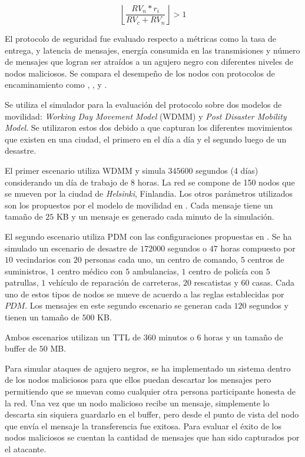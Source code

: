 \begin{equation}
  \left\lfloor \frac{RV_n*r_i}{RV_c+RV_n} \right\rfloor > 1
  \label{eq:fawkes_routing}
\end{equation}




El protocolo de seguridad fue evaluado respecto a métricas como la tasa de
entrega, \overhead{} y latencia de mensajes, energía consumida en las
transmisiones y número de mensajes que logran ser atraídos a un agujero negro
con diferentes niveles de nodos maliciosos. Se compara el desempeño de los nodos
con protocolos de encaminamiento como \syw{} \cite{spyropoulos_spray_2005},
\syf{} \cite{spyropoulos_spray_2007}, \prophet{} y \maxprop.

Se utiliza el simulador \theone{} \cite{keranen_one_2009} para la evaluación del
protocolo sobre dos modelos de movilidad: \textit{Working Day Movement Model}
(WDMM) \cite{ekman_working_2008} y \textit{Post Disaster Mobility Model}. Se
utilizaron estos dos debido a que capturan los diferentes movimientos que
existen en una ciudad, el primero en el día a día y el segundo luego de un
desastre.

El primer escenario utiliza WDMM y simula $345600$ segundos (4 días)
considerando un día de trabajo de $8$ horas. La red se compone de 150 nodos que
se mueven por la ciudad de \textit{Helsinki}, Finlandia. Los otros parámetros
utilizados son los propuestos por el modelo de movilidad en
\cite{ekman_working_2008}.  Cada mensaje tiene un tamaño de $25$ KB y un mensaje
es generado cada minuto de la simulación.

El segundo escenario utiliza PDM con las configuraciones propuestas en
\cite{uddin_post-disaster_2009}. Se ha simulado un escenario de desastre de $172000$
segundos o $47$ horas compuesto por $10$ vecindarios con $20$ personas cada
uno, un centro de comando, $5$ centros de suministros, $1$ centro médico con $5$
ambulancias, $1$ centro de policía con $5$ patrullas, $1$ vehículo de reparación
de carreteras, $20$ rescatistas y $60$ casas. Cada uno de estos tipos de nodos
se mueve de acuerdo a las reglas establecidas por $PDM$. Los mensajes en este
segundo escenario se generan cada $120$ segundos y tienen un tamaño de $500$ KB.

Ambos escenarios utilizan un TTL de $360$ minutos o $6$ horas y un tamaño de
buffer de $50$ MB.

Para simular ataques de agujero negros, se ha implementado un sistema dentro de los
nodos maliciosos para que ellos puedan descartar los mensajes pero permitiendo
que se muevan como cualquier otra persona participante honesta de la red.
Una vez que un nodo malicioso recibe un mensaje, simplemente lo descarta sin
siquiera guardarlo en el buffer, pero desde el punto de vista del nodo que envía
el mensaje la transferencia fue exitosa. Para evaluar el éxito de los nodos
maliciosos se cuentan la cantidad de mensajes que han sido capturados por el
atacante.


